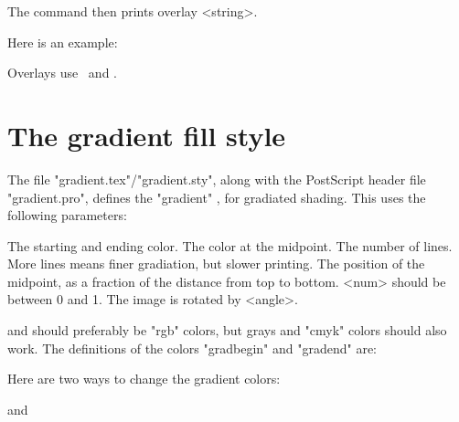 The command
  \Mac  {}
then prints overlay <string>.

Here is an example:
\begin{example}
  \overlaybox
  \endoverlaybox

   \hspace{.5in} 
\end{example}

\begin{drivers} Overlays use \n\pstVerb\ and \n\pstverbscale.\end{drivers}

\section{The gradient fill style}

The file "gradient.tex"/"gradient.sty", along with the PostScript header file
"gradient.pro", defines the "gradient" , for gradiated shading.
This  uses the following parameters:
\begin{description}
  \pitem[gradbegin=color] The starting and ending color.
  \pitem[gradend=color]  The color at the midpoint.
  \pitem[gradlines=int] The number of lines. More lines means finer
gradiation, but slower printing.
  \pitem[gradmidpoint=num] The position of the midpoint, as a fraction of the
distance from top to bottom. <num> should be between 0 and 1.
  \pitem[gradangle=angle] The image is rotated by <angle>.
\end{description}

 and  should preferably be "rgb" colors, but grays and
"cmyk" colors should also work. The definitions of the colors "gradbegin" and
"gradend" are:
\begin{LVerb}
\end{LVerb}
Here are two ways to change the gradient colors:
\begin{LVerb}
\end{LVerb}
and
\begin{LVerb}
\end{LVerb}

